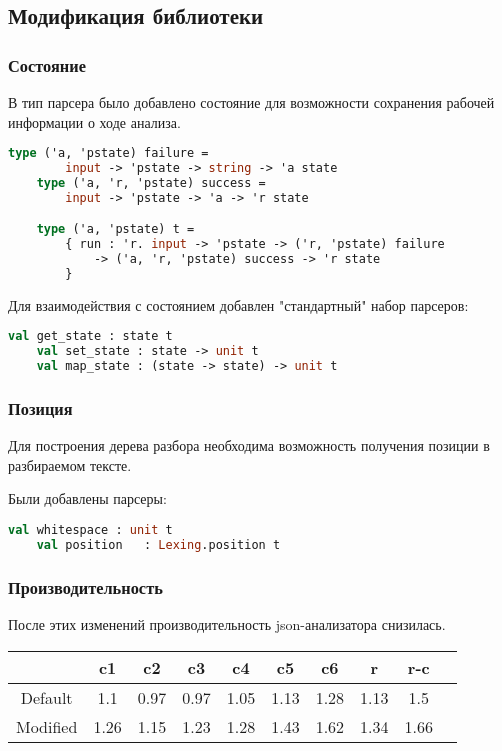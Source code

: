 \subsection{Модификация библиотеки}

\subsubsection{Состояние}

В тип парсера было добавлено состояние для возможности сохранения рабочей информации о ходе анализа.

\begin{lstlisting}[escapechar=!,language=Caml]
    type ('a, 'pstate) failure =
        input -> 'pstate -> string -> 'a state
    type ('a, 'r, 'pstate) success =
        input -> 'pstate -> 'a -> 'r state

    type ('a, 'pstate) t =
        { run : 'r. input -> 'pstate -> ('r, 'pstate) failure
            -> ('a, 'r, 'pstate) success -> 'r state
        }
\end{lstlisting}

Для взаимодействия с состоянием добавлен "стандартный" набор парсеров:

\begin{lstlisting}[escapechar=!,language=Caml]
    val get_state : state t
    val set_state : state -> unit t
    val map_state : (state -> state) -> unit t
\end{lstlisting}

\subsubsection{Позиция}

Для построения дерева разбора необходима возможность получения позиции в разбираемом тексте.

Были добавлены парсеры:

\begin{lstlisting}[escapechar=!,language=Caml]
    val whitespace : unit t
    val position   : Lexing.position t
\end{lstlisting}

\newpage
\subsubsection{Производительность}

После этих изменений производительность json-анализатора снизилась.

\begin{center}
    \begin{tabular}{|c|c|c|c|c|c|c|c|c|c|}
        \hline
                    & c1   & c2   & c3   & c4   & c5   & c6   & r    & r-c
        \\\hline
           Default  & 1.1  & 0.97 & 0.97 & 1.05 & 1.13 & 1.28 & 1.13 & 1.5
        \\ Modified & 1.26 & 1.15 & 1.23 & 1.28 & 1.43 & 1.62 & 1.34 & 1.66
        \\\hline
    \end{tabular}
\end{center}
